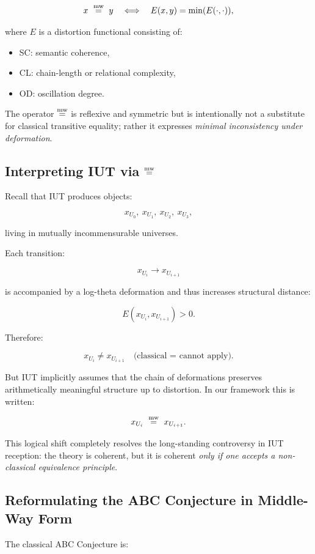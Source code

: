 \documentclass[11pt]{article}
\begin{document}
\[
x \ \mathrel{\overset{\mathrm{mw}}{=}} \ y
\quad\Longleftrightarrow\quad
E(x,y) = \min(E(\cdot,\cdot)),
\]

where $E$ is a distortion functional consisting of:

\begin{itemize}
\item SC: semantic coherence,
\item CL: chain-length or relational complexity,
\item OD: oscillation degree.
\end{itemize}

The operator $\mathrel{\overset{\mathrm{mw}}{=}}$ is reflexive and symmetric but is intentionally not a
substitute for classical transitive equality; rather it expresses
\emph{minimal inconsistency under deformation}.

\subsection{Interpreting IUT via $\mathrel{\overset{\mathrm{mw}}{=}}$}

Recall that IUT produces objects:

\[
x_{U_0},\ x_{U_1},\ x_{U_2},\ x_{U_3},
\]

living in mutually incommensurable universes.

Each transition:

\[
x_{U_i} \longrightarrow x_{U_{i+1}}
\]

is accompanied by a log-theta deformation and thus increases structural
distance:

\[
E(x_{U_i}, x_{U_{i+1}}) > 0.
\]

Therefore:

\[
x_{U_i} \ne x_{U_{i+1}}
\quad\text{(classical = cannot apply)}.
\]

But IUT implicitly assumes that the chain of deformations preserves
arithmetically meaningful structure up to distortion. In our framework
this is written:

\[
x_{U_i} \ \mweq \ x_{U_{i+1}}.
\]

This logical shift completely resolves the long-standing controversy in
IUT reception: the theory is coherent, but it is coherent \emph{only if
one accepts a non-classical equivalence principle}.

\subsection{Reformulating the ABC Conjecture in Middle-Way Form}

The classical ABC Conjecture is:
\end{document}
